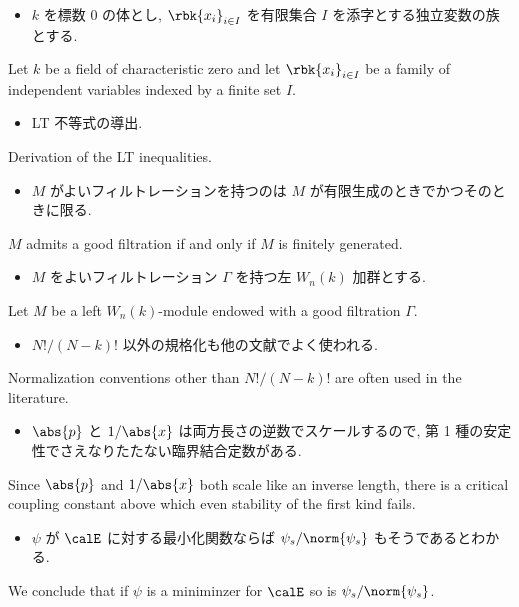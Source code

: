 \documentclass[openany, a4paper, oneside]{jsbook}
\begin{document}
\begin{itemize}
\item $k$ を標数 $0$ の体とし, $\rbk{x_i}_{i \in I}$ を有限集合 $I$ を添字とする独立変数の族とする.
\end{itemize}
Let $k$ be a field of characteristic zero and let $\rbk{x_i}_{i \in I}$ be a family
of independent variables indexed by a finite set $I$.

\begin{itemize}
\item LT 不等式の導出. \cite{LiebSeiringer1}
\end{itemize}
Derivation of the LT inequalities.

\begin{itemize}
\item $M$ がよいフィルトレーションを持つのは $M$ が有限生成のときでかつそのときに限る.
\end{itemize}
$M$ admits a good filtration if and only if $M$ is finitely generated.

\begin{itemize}
\item $M$ をよいフィルトレーション $\Gamma$ を持つ左 $W_n (k)$ 加群とする.
\end{itemize}
Let $M$ be a left $W_n(k)$-module endowed with a good filtration $\Gamma$.

\begin{itemize}
\item $N!/(N-k)!$ 以外の規格化も他の文献でよく使われる. \cite{LiebSeiringer1}
\end{itemize}
Normalization conventions other than $N!/(N-k)!$ are often used in the literature.

\begin{itemize}
\item $\abs{p}$ と $1 / \abs{x}$ は両方長さの逆数でスケールするので, 第 1 種の安定性でさえなりたたない臨界結合定数がある. \cite{LiebSeiringer1}
\end{itemize}
Since $\abs{p}$ and $1 / \abs{x}$ both scale like an inverse length, there is a critical
coupling constant above which even stability of the first kind fails.

\begin{itemize}
\item $\psi$ が $\calE$ に対する最小化関数ならば $\psi_{s} / \norm{\psi_s}$ もそうであるとわかる. \cite{LiebSeiringer1}
\end{itemize}
We conclude that if $\psi$ is a miniminzer for $\calE$ so is $\psi_{s} / \norm{\psi_s}$.
\end{document}

